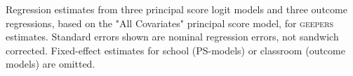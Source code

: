 \documentclass[]{article}
\begin{document}
Regression estimates from three principal score logit models and three outcome regressions, based on the "All Covariates" principal score model, for \textsc{geepers} estimates. Standard errors shown are nominal regression errors, not sandwich corrected. Fixed-effect estimates for school (PS-models) or classroom (outcome models) are omitted.

\small
%









\end{document}
